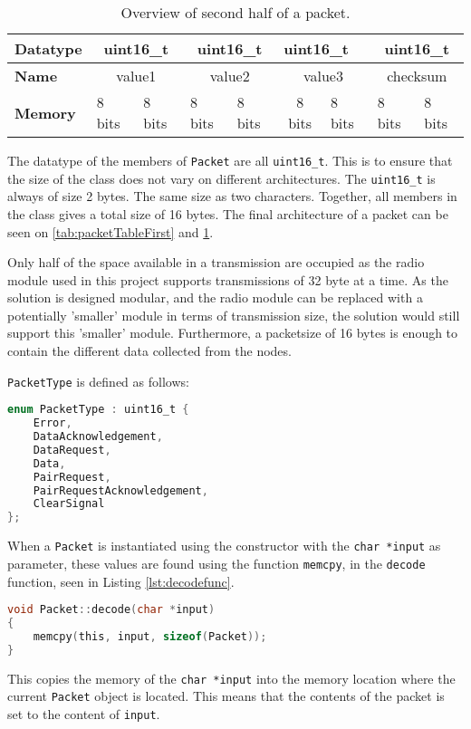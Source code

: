 \begin{table}[]
\centering
\begin{tabular}{|l|c|l|c|l|c|l|c|l|}
\hline
\textbf{Datatype} & \multicolumn{2}{c|}{uint16\_t}       & \multicolumn{2}{c|}{uint16\_t}       & \multicolumn{2}{l|}{uint16\_t} & \multicolumn{2}{c|}{uint16\_t}       \\ \hline
\textbf{Name}     & \multicolumn{2}{c|}{value1}         & \multicolumn{2}{c|}{value2}         & \multicolumn{2}{c|}{value3}   & \multicolumn{2}{c|}{checksum}        \\ \hline
\textbf{Memory}   & \multicolumn{1}{l|}{8 bits} & 8 bits & \multicolumn{1}{l|}{8 bits} & 8 bits & 8 bits         & 8 bits        & \multicolumn{1}{l|}{8 bits} & 8 bits \\ \hline
\end{tabular}
\caption{Overview of second half of a packet.}
\label{tab:packetTableSecond}
\end{table}

The datatype of the members of \texttt{Packet} are all \texttt{uint16\_t}. This is to ensure that the size of the class does not vary on different architectures. The \texttt{uint16\_t} is always of size 2 bytes. The same size as two characters. Together, all members in the class gives a total size of 16 bytes. The final architecture of a packet can be seen on \ref{tab:packetTableFirst} and \ref{tab:packetTableSecond}.

Only half of the space available in a transmission are occupied as the radio module used in this project supports transmissions of 32 byte at a time. As the solution is designed modular, and the radio module can be replaced with a potentially 'smaller' module in terms of transmission size, the solution would still support this 'smaller' module. Furthermore, a packetsize of 16 bytes is enough to contain the different data collected from the nodes.

\texttt{PacketType} is defined as follows:
\begin{lstlisting}[language=C]
enum PacketType : uint16_t {
    Error,
    DataAcknowledgement,
    DataRequest,
    Data,
    PairRequest,
    PairRequestAcknowledgement,
    ClearSignal
};
\end{lstlisting}


When a \texttt{Packet} is instantiated using the constructor with the \texttt{char *input} as parameter, these values are found using the function \texttt{memcpy}, in the \texttt{decode} function, seen in Listing \ref{lst:decodefunc}.
\begin{lstlisting}[language=C,label={lst:decodefunc},caption={Decode function.}]
void Packet::decode(char *input)
{
    memcpy(this, input, sizeof(Packet));
}
\end{lstlisting}
This copies the memory of the \texttt{char *input} into the memory location where the current \texttt{Packet} object is located. This means that the contents of the packet is set to the content of \texttt{input}.

